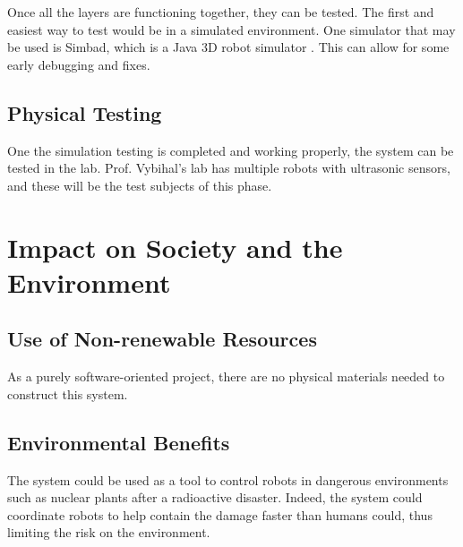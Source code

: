 \documentclass[titlepage,11pt]{article}
\begin{document}
Once all the layers are functioning together, they can be tested. The first and easiest way to test would be in a simulated environment. One simulator that may be used is Simbad, which is a Java 3D robot simulator \cite{simbad}. This can allow for some early debugging and fixes.

\subsection{Physical Testing}

One the simulation testing is completed and working properly, the system can be tested in the lab. Prof. Vybihal's lab has multiple robots with ultrasonic sensors, and these will be the test subjects of this phase.

\section{Impact on Society and the Environment}


\subsection{Use of Non-renewable Resources}

As a purely software-oriented project, there are no physical materials needed to construct this system.

\subsection{Environmental Benefits}

The system could be used as a tool to control robots in dangerous environments such as nuclear plants after a radioactive disaster. Indeed, the system could coordinate robots to help contain the damage faster than humans could, thus limiting the risk on the environment.
\end{document}
